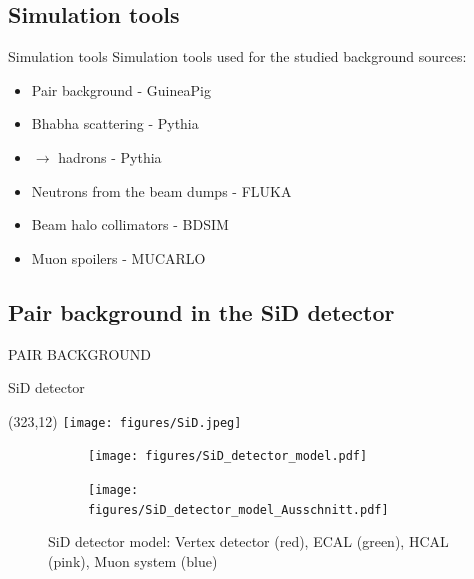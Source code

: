 \documentclass[xcolor={dvipsnames}]{beamer}
\newcommand{\sidlogo}{
  \setlength{\TPHorizModule}{1pt}
  \setlength{\TPVertModule}{1pt}
  \begin{textblock}{1}(323,12)
   \texttt{[image: figures/SiD.jpeg]}
  \end{textblock}
  }
\begin{document}
\subsection{Simulation tools}
\begin{frame}{Simulation tools}
Simulation tools used for the studied background sources:
\vspace*{0.5cm}
  \begin{itemize}
    \item Pair background - \alert{GuineaPig}
    \item Bhabha scattering - \alert{Pythia}
    \item \textgamma \textgamma $\rightarrow$ hadrons - \alert{Pythia}
    \item Neutrons from the beam dumps - \alert{FLUKA}
    \item Beam halo collimators - \alert{BDSIM}
    \item Muon spoilers - \alert{MUCARLO}
  \end{itemize}
\end{frame}

\subsection{Pair background in the SiD detector}
\begin{frame}
 \begin{center}
  \alert{\MakeUppercase{Pair background}}
 \end{center}
\end{frame}

\begin{frame}{SiD detector}
\sidlogo
\begin{figure}[T]
\centering
\begin{subfigure}[b]{0.49\textwidth}
\centering
\texttt{[image: figures/SiD\_detector\_model.pdf]}
\end{subfigure}
\begin{subfigure}[b]{0.49\textwidth}
\centering
\texttt{[image: figures/SiD\_detector\_model\_Ausschnitt.pdf]}
\end{subfigure}
\caption{\small SiD detector model: Vertex detector (red), ECAL (green), HCAL (pink), Muon system (blue)}
\end{figure}
\end{frame}
\end{document}
